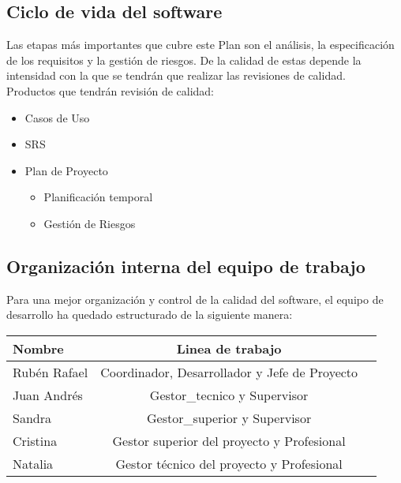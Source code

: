 \documentclass[11pt, a4paper, twoside, titlepage]{article}
\begin{document}
		\subsection{Ciclo de vida del software} %
			Las etapas más importantes que cubre este Plan son el análisis, la especificación de los requisitos y la gestión de riesgos. De la calidad de estas depende la intensidad con la que se tendrán que realizar las revisiones de calidad. \\
			Productos que tendrán revisión de calidad: \\
				\begin{itemize}
					\item Casos de Uso
					\item SRS
					\item Plan de Proyecto
						\begin{itemize}
							\item Planificación temporal
							\item Gestión de Riesgos
						\end{itemize}
				\end{itemize}
				
		\subsection{Organización interna del equipo de trabajo}
		
			Para una mejor organización y control de la calidad del software, el equipo de desarrollo ha quedado estructurado de la siguiente manera:
			
			\begin{center}
				\begin{tabular}{|l |c |r|}
				\hline
				\textbf{Nombre} & \textbf{Linea de trabajo}\\
				\hline
				Rubén Rafael & Coordinador, Desarrollador y Jefe de Proyecto\\
				\hline
				Juan Andrés & \gls{Gestor_tecnico} y Supervisor\\
				\hline
				Sandra & \gls{Gestor_superior} y Supervisor\\
				\hline
				Cristina & Gestor superior del proyecto y \gls{Profesional}\\
				\hline
				Natalia & Gestor técnico del proyecto y Profesional\\
				\hline
				\end{tabular}
			\end{center}
			
\end{document}

